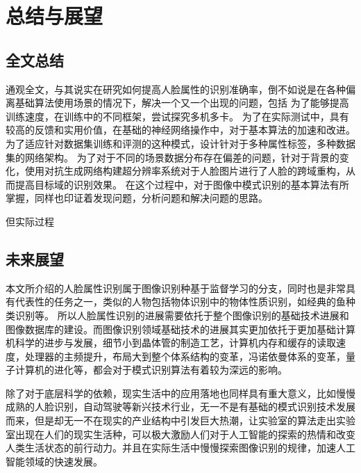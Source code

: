 \chapter{总结与展望}
\section{全文总结}
通观全文，与其说实在研究如何提高人脸属性的识别准确率，倒不如说是在各种偏离基础算法使用场景的情况下，解决一个又一个出现的问题，包括
为了能够提高训练速度，在训练中的不同框架，尝试探究多机多卡。
为了在实际测试中，具有较高的反馈和实用价值，在基础的神经网络操作中，对于基本算法的加速和改进。
为了适应针对数据集训练和评测的这种模式，设计针对于多种属性标签，多种数据集的网络架构。
为了对于不同的场景数据分布存在偏差的问题，针对于背景的变化，使用对抗生成网络构建超分辨率系统对于人脸图片进行了人脸的跨域重构，从而提高目标域的识别效果。
在这个过程中，对于图像中模式识别的基本算法有所掌握，同样也印证着发现问题，分析问题和解决问题的思路。

但实际过程

\section{未来展望}
本文所介绍的人脸属性识别属于图像识别种基于监督学习的分支，同时也是非常具有代表性的任务之一，类似的人物包括物体识别中的物体性质识别，如经典的鱼种类识别等。
所以人脸属性识别的进展需要依托于整个图像识别的基础技术进展和图像数据库的建设。而图像识别领域基础技术的进展其实更加依托于更加基础计算机科学的进步与发展，细节小到晶体管的制造工艺，计算机内存和缓存的读取速度，处理器的主频提升，布局大到整个体系结构的变革，冯诺依曼体系的变革，量子计算机的进化等，都会对于模式识别算法有着较为深远的影响。

除了对于底层科学的依赖，现实生活中的应用落地也同样具有重大意义，比如慢慢成熟的人脸识别，自动驾驶等新兴技术行业，无一不是有基础的模式识别技术发展而来，但是却无一不在现实的产业结构中引发巨大热潮，让实验室的算法走出实验室出现在人们的现实生活种，可以极大激励人们对于人工智能的探索的热情和改变人类生活状态的前行动力。并且在实际生活中慢慢探索图像识别的规律，加速人工智能领域的快速发展。



 
